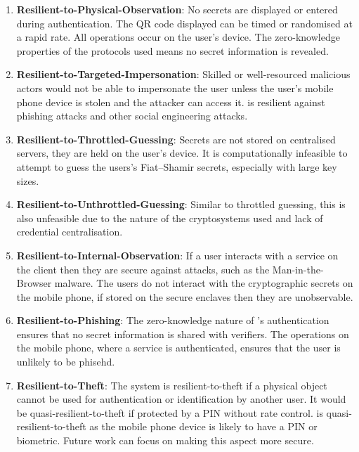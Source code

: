 \begin{enumerate}
    \item \textbf{Resilient-to-Physical-Observation}: No secrets are displayed or entered during authentication. The QR code displayed can be timed or randomised at a rapid rate. All operations occur on the user's device. The zero-knowledge properties of the protocols used means no secret information is revealed.

    \item \textbf{Resilient-to-Targeted-Impersonation}: Skilled or well-resourced malicious actors would not be able to impersonate the user unless the user's mobile phone device is stolen and the attacker can access it. \deeid is resilient against phishing attacks and other social engineering attacks.

    \item \textbf{Resilient-to-Throttled-Guessing}: Secrets are not stored on centralised servers, they are held on the user's device. It is computationally infeasible to attempt to guess the users's Fiat--Shamir secrets, especially with large key sizes.

    \item \textbf{Resilient-to-Unthrottled-Guessing}: Similar to throttled guessing, this is also unfeasible due to the nature of the cryptosystems used and lack of credential centralisation.

    \item \textbf{Resilient-to-Internal-Observation}: If a user interacts with a service on the client then they are secure against attacks, such as the Man-in-the-Browser malware. The users do not interact with the cryptographic secrets on the mobile phone, if stored on the secure enclaves then they are unobservable.

    \item \textbf{Resilient-to-Phishing}: The zero-knowledge nature of \deeid’s authentication ensures that no secret information is shared with verifiers. The operations on the mobile phone, where a service is authenticated, ensures that the user is unlikely to be phisehd.

    \item \textbf{Resilient-to-Theft}: The system is resilient-to-theft if a physical object cannot be used for authentication or identification by another user. It would be quasi-resilient-to-theft if protected by a PIN without rate control. \deeid is quasi-resilient-to-theft as the mobile phone device is likely to have a PIN or biometric. Future work can focus on making this aspect more secure.


\end{enumerate}
